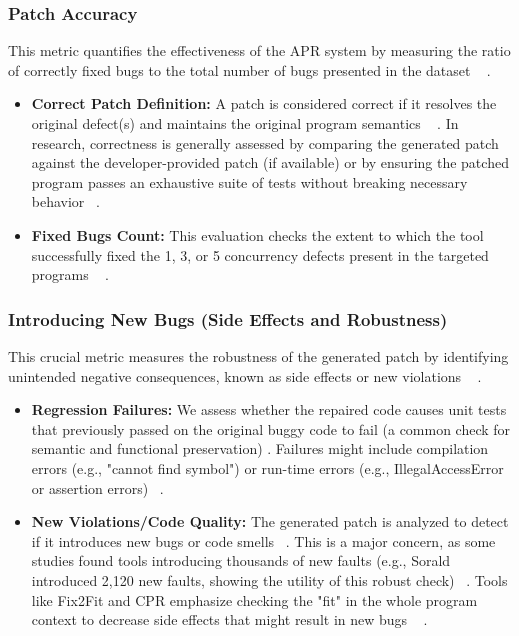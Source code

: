 \subsubsection{Patch Accuracy} This metric quantifies the effectiveness of the APR system by measuring the ratio of correctly fixed bugs to the total number of bugs presented in the dataset ~\cite{yang2025,liu2021_1}
.
\begin{itemize} \item \textbf{Correct Patch Definition:} A patch is considered correct if it resolves the original defect(s) and maintains the original program semantics ~\cite{liu2021_2}
. In research, correctness is generally assessed by comparing the generated patch against the developer-provided patch (if available) or by ensuring the patched program passes an exhaustive suite of tests without breaking necessary behavior ~\cite{yang2023,liu2021_1}. \item \textbf{Fixed Bugs Count:} This evaluation checks the extent to which the tool successfully fixed the 1, 3, or 5 concurrency defects present in the targeted programs ~\cite{liu2021_2}
. \end{itemize}
\subsubsection{Introducing New Bugs (Side Effects and Robustness)} This crucial metric measures the robustness of the generated patch by identifying unintended negative consequences, known as side effects or new violations ~\cite{liyanage2025}
.
\begin{itemize} \item \textbf{Regression Failures:} We assess whether the repaired code causes unit tests that previously passed on the original buggy code to fail (a common check for semantic and functional preservation)
. Failures might include compilation errors (e.g., "cannot find symbol") or run-time errors (e.g., IllegalAccessError or assertion errors) ~\cite{liyanage2025}. \item \textbf{New Violations/Code Quality:} The generated patch is analyzed to detect if it introduces new bugs or code smells ~\cite{liyanage2025}. This is a major concern, as some studies found tools introducing thousands of new faults (e.g., Sorald introduced 2,120 new faults, showing the utility of this robust check) ~\cite{liyanage2025}. Tools like Fix2Fit and CPR emphasize checking the "fit" in the whole program context to decrease side effects that might result in new bugs ~\cite{anand2024}
. \end{itemize}
